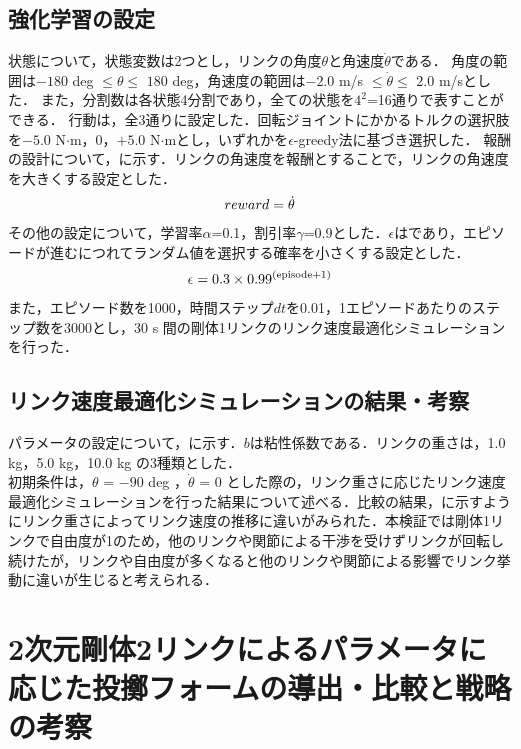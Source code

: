 \begin{small}
\subsection{強化学習の設定}
状態について，状態変数は2つとし，リンクの角度$\theta$と角速度$\dot{\theta}$である．
角度の範囲は$-180$ deg $\leq \theta \leq$ $180$ deg，角速度の範囲は$-2.0$ m/s $\leq \dot{\theta} \leq$ $2.0$ m/sとした．
また，分割数は各状態4分割であり，全ての状態を$4^{2}$=16通りで表すことができる．
行動は，全3通りに設定した．回転ジョイントにかかるトルクの選択肢を$-5.0$ N$\cdot$m，$0$，$+5.0$ N$\cdot$mとし，いずれかを$\epsilon$-greedy法に基づき選択した．
報酬の設計について，に示す．リンクの角速度を報酬とすることで，リンクの角速度を大きくする設定とした．
\begin{eqnarray}
  \equlabel{3}
  reward = \dot{\theta}
\end{eqnarray}
その他の設定について，学習率$\alpha$=0.1，割引率$\gamma$=0.9とした．$\epsilon$はであり，エピソードが進むにつれてランダム値を選択する確率を小さくする設定とした．
\begin{eqnarray}
  \equlabel{4}
  \epsilon = 0.3 \times 0.99^{(\mathrm{episode} + 1)}
\end{eqnarray}
また，エピソード数を1000，時間ステップ$dt$を0.01，1エピソードあたりのステップ数を3000とし，30 s 間の剛体1リンクのリンク速度最適化シミュレーションを行った．
\subsection{リンク速度最適化シミュレーションの結果・考察}
パラメータの設定について，に示す．$b$は粘性係数である．リンクの重さは，1.0 kg，5.0 kg，10.0 kg の3種類とした．\\
初期条件は，$\theta$ = $-90$ deg ，$\dot{\theta}$ = 0 とした際の，リンク重さに応じたリンク速度最適化シミュレーションを行った結果について述べる．比較の結果，に示すようにリンク重さによってリンク速度の推移に違いがみられた．本検証では剛体1リンクで自由度が1のため，他のリンクや関節による干渉を受けずリンクが回転し続けたが，リンクや自由度が多くなると他のリンクや関節による影響でリンク挙動に違いが生じると考えられる．
\section{2次元剛体2リンクによるパラメータに応じた投擲フォームの導出・比較と戦略の考察}

\end{small}

